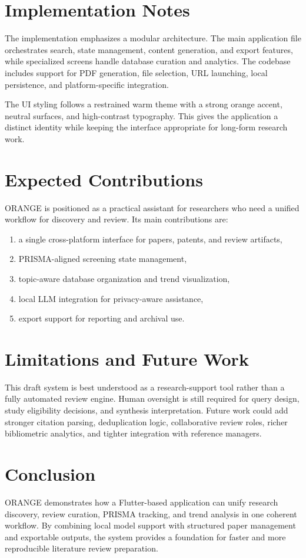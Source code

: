 \documentclass[11pt,a4paper]{article}
\begin{document}
\section{Implementation Notes}
The implementation emphasizes a modular architecture. The main application file orchestrates search, state management, content generation, and export features, while specialized screens handle database curation and analytics. The codebase includes support for PDF generation, file selection, URL launching, local persistence, and platform-specific integration.

The UI styling follows a restrained warm theme with a strong orange accent, neutral surfaces, and high-contrast typography. This gives the application a distinct identity while keeping the interface appropriate for long-form research work.

\section{Expected Contributions}
ORANGE is positioned as a practical assistant for researchers who need a unified workflow for discovery and review. Its main contributions are:
\begin{enumerate}[leftmargin=1.2em]
  \item a single cross-platform interface for papers, patents, and review artifacts,
  \item PRISMA-aligned screening state management,
  \item topic-aware database organization and trend visualization,
  \item local LLM integration for privacy-aware assistance,
  \item export support for reporting and archival use.
\end{enumerate}

\section{Limitations and Future Work}
This draft system is best understood as a research-support tool rather than a fully automated review engine. Human oversight is still required for query design, study eligibility decisions, and synthesis interpretation. Future work could add stronger citation parsing, deduplication logic, collaborative review roles, richer bibliometric analytics, and tighter integration with reference managers.

\section{Conclusion}
ORANGE demonstrates how a Flutter-based application can unify research discovery, review curation, PRISMA tracking, and trend analysis in one coherent workflow. By combining local model support with structured paper management and exportable outputs, the system provides a foundation for faster and more reproducible literature review preparation.
\end{document}
